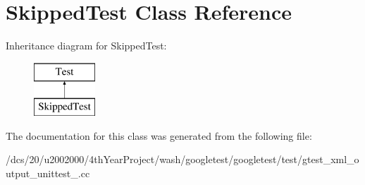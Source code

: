 \hypertarget{classSkippedTest}{}\section{Skipped\+Test Class Reference}
\label{classSkippedTest}
Inheritance diagram for Skipped\+Test\+:\begin{figure}[H]
\begin{center}
\leavevmode
\includegraphics[height=2.000000cm]{classSkippedTest}
\end{center}
\end{figure}


The documentation for this class was generated from the following file\+:\begin{DoxyCompactItemize}
\item 
/dcs/20/u2002000/4th\+Year\+Project/wash/googletest/googletest/test/gtest\+\_\+xml\+\_\+output\+\_\+unittest\+\_\+.\+cc\end{DoxyCompactItemize}

